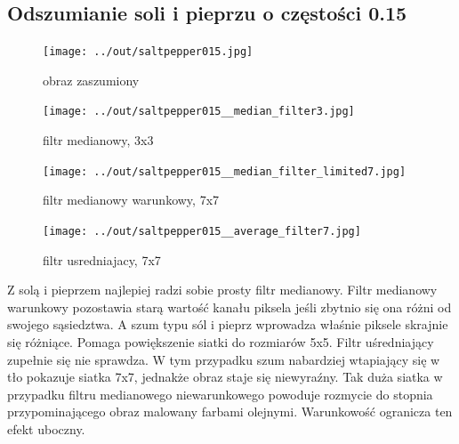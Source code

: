 \documentclass[a4paper,12pt]{article}
\begin{document}
\newpage
\subsection{Odszumianie soli i pieprzu o częstości 0.15}
\begin{figure}[h!]
\begin{minipage}[t]{7.5cm}
\begin{center}
\texttt{[image: ../out/saltpepper015.jpg]}
\caption{obraz zaszumiony}
\end{center}
\end{minipage}
\hfill
\begin{minipage}[t]{7.5cm}
\begin{center}
\texttt{[image: ../out/saltpepper015\_\_median\_filter3.jpg]}
\caption{filtr medianowy, 3x3}
\end{center}
\end{minipage}
\end{figure}

\begin{figure}[h!]
\begin{minipage}[t]{7.5cm}
\begin{center}
\texttt{[image: ../out/saltpepper015\_\_median\_filter\_limited7.jpg]}
\caption{filtr medianowy warunkowy, 7x7}
\end{center}
\end{minipage}
\hfill
\begin{minipage}[t]{7.5cm}
\begin{center}
\texttt{[image: ../out/saltpepper015\_\_average\_filter7.jpg]}
\caption{filtr usredniajacy, 7x7}
\end{center}
\end{minipage}
\end{figure}


Z solą i pieprzem najlepiej radzi sobie prosty filtr medianowy. Filtr medianowy warunkowy pozostawia starą wartość kanału piksela jeśli zbytnio się ona różni od swojego sąsiedztwa. A szum typu sól i pieprz wprowadza właśnie piksele skrajnie się różniące. Pomaga powiększenie siatki do rozmiarów 5x5. Filtr uśredniający zupełnie się nie sprawdza. W tym przypadku szum nabardziej wtapiający się w tło pokazuje siatka 7x7, jednakże obraz staje się niewyraźny. Tak duża siatka w przypadku filtru medianowego niewarunkowego powoduje rozmycie do stopnia przypominającego obraz malowany farbami olejnymi. Warunkowość ogranicza ten efekt uboczny.




\newpage
\end{document}
